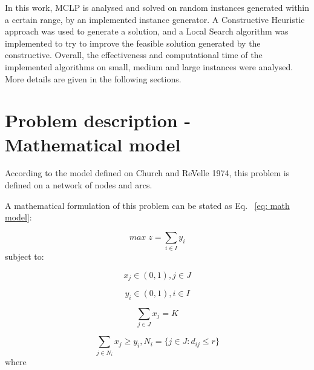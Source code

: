 \documentclass[11pt, a4paper]{article}
\begin{document}
In this work, MCLP is analysed and solved on random instances generated within a certain range, by an implemented instance generator. A Constructive Heuristic approach was used to generate a solution, and a Local Search algorithm was implemented to try to improve the feasible solution generated by the constructive. Overall, the effectiveness and computational time of the implemented algorithms on small, medium and large instances were analysed. More details are given in the following sections.

\section{Problem description - Mathematical model}\label{sec:lit}
According to the model defined on Church and ReVelle 1974, this problem is defined on a network of nodes and arcs. 

A mathematical formulation of this problem can be stated as Eq. ~\ref{eq: math model}:

\begin{equation}\label{eq: math model}
	max \; z = \sum_{i \in I}y_i
\end{equation}
subject to:

\begin{equation}\label{eq: r1}
	x_{j} \in (0,1), j \in J
\end{equation}

\begin{equation}\label{eq: r2}
	y_{i} \in (0,1), i \in I
\end{equation}

\begin{equation}\label{eq: r3}
	\sum_{j \in J}x_j = K
\end{equation}

\begin{equation}\label{eq: r4}
	\sum_{j \in N_i} x_j \geq y_i, N_i = \big\{ j \in J: d_{ij} \leq r \big\}
\end{equation}
where
\end{document}
